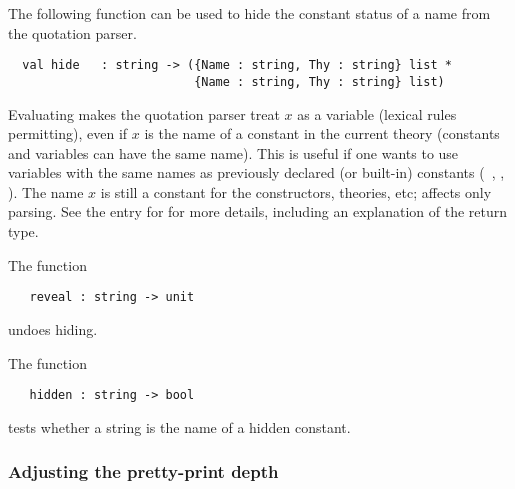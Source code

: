 {
%
The following function can be used to hide the constant status of a
name from the quotation parser.

\begin{boxed}
\begin{verbatim}
  val hide   : string -> ({Name : string, Thy : string} list *
                          {Name : string, Thy : string} list)
\end{verbatim}
\end{boxed}

\noindent Evaluating 
makes the quotation parser treat $x$ as a variable (lexical
rules permitting), even if $x$ is the name of a constant in the current theory
(constants and variables can have the same name).
This is useful if one wants to use variables
%
%
with the same names as previously declared (or built-in) constants
(\eg\ , ,  \etc).  The name $x$ is still a constant
for the constructors, theories, etc;  affects only parsing.
See the \REFERENCE{} entry for  for more details, including
an explanation of the return type.

The function

\begin{boxed}
\begin{verbatim}
   reveal : string -> unit
\end{verbatim}
\end{boxed}

\noindent undoes hiding.

The function

\begin{boxed}
\begin{verbatim}
   hidden : string -> bool
\end{verbatim}
\end{boxed}

\noindent tests whether a string is the name of a hidden constant.

\subsubsection{Adjusting the pretty-print depth}

}
